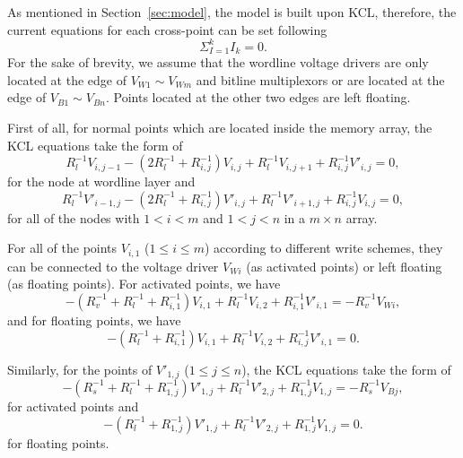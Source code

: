\label{sec:app}

As mentioned in Section~\ref{sec:model}, the model is built upon KCL,
therefore, the current equations for each cross-point can be set following
\begin{equation}\label{equ:KCL0}
 {\Sigma}_{I=1}^kI_k=0.
\end{equation}
For the sake of brevity, we assume that the wordline voltage drivers are
only located at the edge of $V_{W1} \sim V_{Wm}$ and bitline multiplexors
or are located at the edge of $V_{B1} \sim V_{Bn}$. Points located at the
other two edges are left floating.

First of all, for normal points which are located inside the memory array,
the KCL equations take the form of
\begin{equation}\label{equ:KCL1}
R_l^{-1}V_{i,j-1} -(2R_l^{-1}+R_{i,j}^{-1})V_{i,j}+ R_l^{-1}V_{i,j+1}+R_{i,j}^{-1}V'_{i,j}=0,
\end{equation}
for the node at wordline layer and
\begin{equation}\label{equ:KCL2}
R_l^{-1}V'_{i-1,j} -(2R_l^{-1}+R_{i,j}^{-1})V'_{i,j}+ R_l^{-1}V'_{i+1,j}+R_{i,j}^{-1}V_{i,j}=0,
\end{equation}
for all of the nodes with $1<i<m$ and $1<j<n$ in a $m \times n$ array.

For all of the points $V_{i,1}$ ($1\leq i\leq m$) according to different
write schemes, they can be connected to the voltage driver $V_{Wi}$ (as
activated points) or left floating (as floating points). For activated
points, we have
\begin{equation}\label{equ:KCL3}
 -(R_v^{-1}+R_l^{-1}+R_{i,1}^{-1})V_{i,1}+ R_l^{-1}V_{i,2}+R_{i,1}^{-1}V'_{i,1}=-R_v^{-1}V_{Wi},
\end{equation}
and for floating points, we have
\begin{equation}\label{equ:KCL4}
 -(R_l^{-1}+R_{i,1}^{-1})V_{i,1}+ R_l^{-1}V_{i,2}+R_{i,j}^{-1}V'_{i,1}=0.
\end{equation}

Similarly, for the points of $V'_{1,j}$ ($1\leq j\leq n$), the KCL
equations take the form of
\begin{equation}\label{equ:KCL5}
 -(R_s^{-1}+R_l^{-1}+R_{1,j}^{-1})V'_{1,j}+ R_l^{-1}V'_{2,j}+R_{1,j}^{-1}V_{1,j}=-R_s^{-1}V_{Bj},
\end{equation}
for activated points and
\begin{equation}\label{equ:KCL6}
 -(R_l^{-1}+R_{1,j}^{-1})V'_{1,j}+ R_l^{-1}V'_{2,j}+R_{1,j}^{-1}V_{1,j}=0.
\end{equation}
for floating points.

